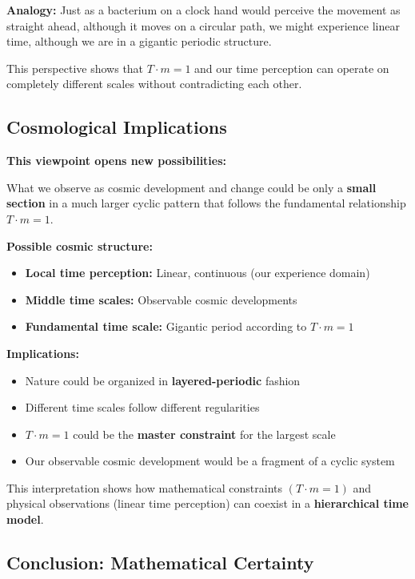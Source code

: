 \documentclass[12pt,a4paper]{article}
\theoremstyle{definition}
\theoremstyle{remark}
\begin{document}
	\textbf{Analogy:} Just as a bacterium on a clock hand would perceive the movement as \glqq straight ahead\grqq, although it moves on a circular path, we might experience \glqq linear time\grqq, although we are in a gigantic periodic structure.
	
	This perspective shows that $T \cdot m = 1$ and our time perception can operate on completely different scales without contradicting each other.
	
	\subsection{Cosmological Implications}
	
	\textbf{This viewpoint opens new possibilities:}
	
	What we observe as cosmic development and change could be only a \textbf{small section} in a much larger cyclic pattern that follows the fundamental relationship $T \cdot m = 1$.
	
	\textbf{Possible cosmic structure:}
	\begin{itemize}
		\item \textbf{Local time perception:} Linear, continuous (our experience domain)
		\item \textbf{Middle time scales:} Observable cosmic developments
		\item \textbf{Fundamental time scale:} Gigantic period according to $T \cdot m = 1$
	\end{itemize}
	
	\textbf{Implications:}
	\begin{itemize}
		\item Nature could be organized in \textbf{layered-periodic} fashion
		\item Different time scales follow different regularities
		\item $T \cdot m = 1$ could be the \textbf{master constraint} for the largest scale
		\item Our observable cosmic development would be a fragment of a cyclic system
	\end{itemize}
	
	This interpretation shows how mathematical constraints $(T \cdot m = 1)$ and physical observations (linear time perception) can coexist in a \textbf{hierarchical time model}.
	
	\subsection{Conclusion: Mathematical Certainty}
	
\end{document}
